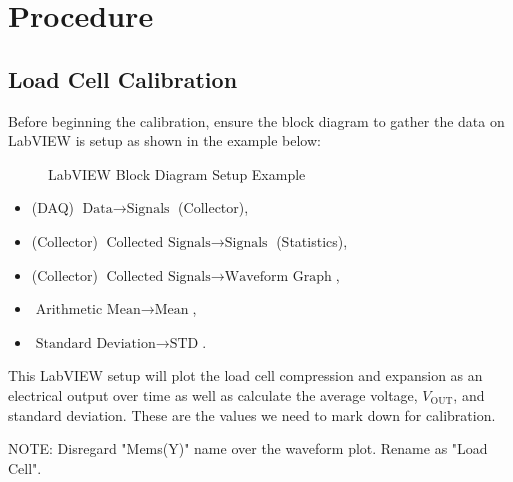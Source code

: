 \documentclass{article}
\begin{document}
\section{Procedure}
\subsection{Load Cell Calibration}
Before beginning the calibration, ensure the block diagram to gather the data on LabVIEW is setup as shown in the example below:
\begin{figure}[H]
    \centering
    \caption{LabVIEW Block Diagram Setup Example}
    \label{fig:labview1}
\end{figure}

\begin{itemize}
    \item (DAQ) $\text{Data}\rightarrow \text{Signals}$ (Collector),
    \item (Collector) $\text{Collected Signals}\rightarrow \text{Signals}$ (Statistics),
    \item (Collector) $\text{Collected Signals}\rightarrow \text{Waveform Graph}$,
    \item  $\text{Arithmetic Mean}\rightarrow \text{Mean}$,
    \item  $\text{Standard Deviation}\rightarrow \text{STD}$.
\end{itemize}

This LabVIEW setup will plot the load cell compression and expansion as an electrical output over time as well as calculate the average voltage, $V_{\text{OUT}}$, and standard deviation. These are the values we need to mark down for calibration.
\vspace{1mm}

NOTE: Disregard "Mems(Y)" name over the waveform plot. Rename as "Load Cell".
\vspace{5mm}
\end{document}
